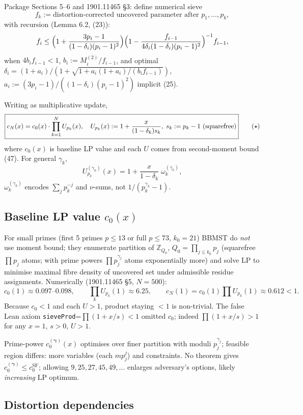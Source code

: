 \documentclass[11pt,a4paper]{article}
\theoremstyle{plain}
\theoremstyle{definition}
\theoremstyle{remark}
\newcommand{\Z}{\mathbb{Z}}
\newcommand{\cN}{c_{N}}
\newcommand{\cO}{c_{0}}
\begin{document}
Package Sections 5--6 and 1901.11465 \S3: define numerical sieve
\[
f_{k}:=\text{distortion-corrected uncovered parameter after }p_{1},\dots,p_{k},
\]
with recursion (Lemma 6.2, (23)):
\[
f_{i}\le\Bigl(1+\frac{3p_{i}-1}{(1-\delta_{i})(p_{i}-1)^{2}}\Bigr)\Bigl(1-\frac{f_{i-1}}{4\delta_{i}(1-\delta_{i})(p_{i}-1)^{2}}\Bigr)^{-1}f_{i-1},
\]
when $4b_{i}f_{i-1}<1$, $b_{i}:=M_{i}^{(2)}/f_{i-1}$, and optimal $\delta_{i}=(1+a_{i})/(1+\sqrt{1+a_{i}(1+a_{i})/(b_{i}f_{i-1})})$, $a_{i}:=(3p_{i}-1)/((1-\delta_{i})(p_{i}-1)^{2})$ implicit (25).

Writing as multiplicative update,
\[
\boxed{\cN(x)=\cO(x)\cdot\prod_{k=1}^{N}U_{p_{k}}(x),\quad U_{p_{k}}(x):=1+\frac{x}{(1-\delta_{k})s_{k}},\;s_{k}:=p_{k}-1\text{ (squarefree)}} \tag{\ensuremath{\star}}
\]
where $\cO(x)$ is baseline LP value and each $U$ comes from second-moment bound (47). For general $\gamma_{k}$,
\[
U_{p_{k}}^{(\gamma_{k})}(x)=1+\frac{x}{1-\delta_{k}}\;\omega_{k}^{(\gamma_{k})},
\]
$\omega_{k}^{(\gamma_{k})}$ encodes $\sum_{j}p_{k}^{-j}$ and $\nu$-sums, not $1/(p_{k}^{\gamma_{k}}-1)$.

\subsection{Baseline LP value \texorpdfstring{$\cO(x)$}{O(x)}}

For small primes (first 5 primes $p\le13$ or full $p\le73$, $k_{0}=21$) BBMST do \emph{not} use moment bound; they enumerate partition of $\Z_{Q_{0}}$, $Q_{0}=\prod_{j\le k_{0}}p_{j}$ (squarefree $\prod p_{j}$ atoms; with prime powers $\prod p_{j}^{\gamma_{j}}$ atoms exponentially more) and solve LP to minimise maximal fibre density of uncovered set under admissible residue assignments. Numerically (1901.11465 \S5, $N=500$):
\[
\boxed{\cO(1)\approx0.097\text{--}0.098},\qquad\prod_{k}U_{p_{k}}(1)\approx6.25,\qquad\cN(1)=\cO(1)\prod U_{p_{k}}(1)\approx0.612<1.
\]
Because $\cO<1$ and each $U>1$, product staying $<1$ is non-trivial. The false Lean axiom \texttt{sieveProd}=$\prod(1+x/s)<1$ omitted $\cO$; indeed $\prod(1+x/s)>1$ for any $x=1$, $s>0$, $U>1$.

Prime-power $\cO^{(\boldsymbol\gamma)}(x)$ optimises over finer partition with moduli $p_{j}^{\gamma_{j}}$; feasible region differs: more variables (each $mp_{j}^{j}$) and constraints. No theorem gives $\cO^{(\boldsymbol\gamma)}\le\cO^{\mathrm{SF}}$; allowing $9,25,27,45,49,\dots$ enlarges adversary's options, likely \emph{increasing} LP optimum.

\subsection{Distortion dependencies}
\end{document}
